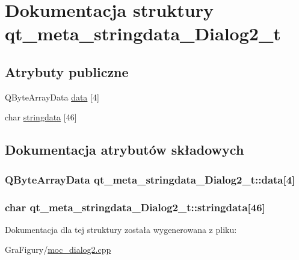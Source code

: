 \hypertarget{structqt__meta__stringdata__Dialog2__t}{\section{Dokumentacja struktury qt\-\_\-meta\-\_\-stringdata\-\_\-\-Dialog2\-\_\-t}
\label{structqt__meta__stringdata__Dialog2__t}
}
\subsection*{Atrybuty publiczne}
\begin{DoxyCompactItemize}
\item 
Q\-Byte\-Array\-Data \hyperlink{structqt__meta__stringdata__Dialog2__t_a4474af9385f4db2489a67ef52b534cd0}{data} \mbox{[}4\mbox{]}
\item 
char \hyperlink{structqt__meta__stringdata__Dialog2__t_a67432a281470c83d5bbfb8369b23c4b0}{stringdata} \mbox{[}46\mbox{]}
\end{DoxyCompactItemize}


\subsection{Dokumentacja atrybutów składowych}
\hypertarget{structqt__meta__stringdata__Dialog2__t_a4474af9385f4db2489a67ef52b534cd0}{
\subsubsection[{data}]{\setlength{\rightskip}{0pt plus 5cm}Q\-Byte\-Array\-Data qt\-\_\-meta\-\_\-stringdata\-\_\-\-Dialog2\-\_\-t\-::data\mbox{[}4\mbox{]}}}\label{structqt__meta__stringdata__Dialog2__t_a4474af9385f4db2489a67ef52b534cd0}
\hypertarget{structqt__meta__stringdata__Dialog2__t_a67432a281470c83d5bbfb8369b23c4b0}{
\subsubsection[{stringdata}]{\setlength{\rightskip}{0pt plus 5cm}char qt\-\_\-meta\-\_\-stringdata\-\_\-\-Dialog2\-\_\-t\-::stringdata\mbox{[}46\mbox{]}}}\label{structqt__meta__stringdata__Dialog2__t_a67432a281470c83d5bbfb8369b23c4b0}


Dokumentacja dla tej struktury została wygenerowana z pliku\-:\begin{DoxyCompactItemize}
\item 
Gra\-Figury/\hyperlink{moc__dialog2_8cpp}{moc\-\_\-dialog2.\-cpp}\end{DoxyCompactItemize}
